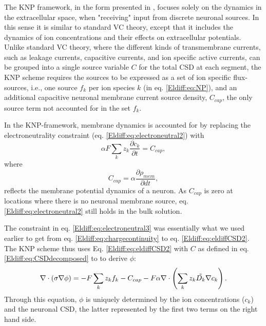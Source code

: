 \subsubsection{}
The KNP framework, in the form presented in \cite{Solbra2018}, focuses solely on the dynamics in the extracellular space, when "receiving" input from discrete neuronal sources. In this sense it is similar to standard VC theory, except that it includes the dynamics of ion concentrations and their effects on extracellular potentials. Unlike standard VC theory, where the different kinds of transmembrane currents, such as leakage currents, capacitive currents, and ion specific active currents, can be grouped into a single source variable $C$ for the total CSD at each segment, the KNP scheme requires the sources to be expressed as a set of ion specific flux-sources, i.e., one source $f_k$ per ion species $k$ (in eq. \ref{Eldiff:eq:NP}), and an additional capacitive neuronal membrane current source density, $C_{cap}$, the only source term not accounted for in the set $f_k$.

In the KNP-framework, membrane dynamics is accounted for by replacing the electroneutrality constraint (eq. \ref{Eldiff:eq:electroneutral2}) with
\begin{equation}
\alpha F \sum_k{z_k \frac{\partial c_k}{\partial t}} = C_{cap},
\label{Eldiff:eq:electroneutral3}
\end{equation}
where 
\begin{equation}
C_{cap} = {\alpha}\frac{\partial \rho_{mem}}{\partial dt},
\label{Eldiff:eq:Andreas}
\end{equation}
reflects the membrane potential dynamics of a neuron. As $C_{cap}$ is zero at locations where there is no neuronal membrane source, eq. \ref{Eldiff:eq:electroneutral2} still holds in the bulk solution. 

The constraint in eq. \ref{Eldiff:eq:electroneutral3} was essentially what we used earlier to get from eq. \ref{Eldiff:eq:chargecontinuity} to eq. \ref{Eldiff:eq:eldiffCSD2}. The KNP scheme thus uses Eq. \ref{Eldiff:eq:eldiffCSD2} with $C$ as defined in eq.  \ref{Eldiff:eq:CSDdecomposed} to to derive $\phi$:
\begin{equation}
\nabla \cdot (\sigma\nabla\phi) = - F \sum_k z_k f_k -  C_{cap} - F\alpha \nabla \cdot \left (\sum_k{z_k \tilde{D_k}{\bf \nabla} c_{k}} \right).
\label{Eldiff:eq:KNPfinal}
\end{equation}
Through this equation, $\phi$ is uniquely determined by the ion concentrations ($c_k$) and the neuronal CSD, the latter represented by the first two terms on the right hand side.

